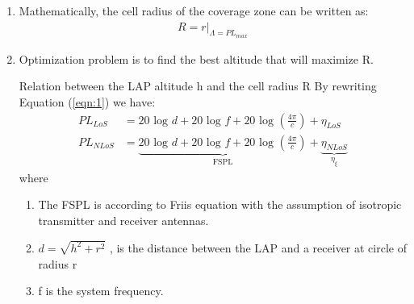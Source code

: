 \documentclass{beamer}
\begin{document}
\begin{frame}{}
    \begin{enumerate}
        \item Mathematically, the cell radius of the coverage zone can be written as:
        \begin{align}
            R = r|_{\Lambda = PL_{max}}
            \label{eqn:7}
        \end{align}
        \item Optimization problem is to find the best altitude that will maximize R.
        \begin{block}{Relation between the LAP altitude h and the cell radius R }
        By rewriting Equation (\ref{eqn:1}) we have: 
        \begin{align}
            PL_{LoS} &= 20 \text{ log } d + 20 \text{ log } f + 20\text{ log }(\frac{4 \pi}{c}) +   \eta_{LoS} 
            \label{eqn:8}\\
PL_{NLoS} &= \underbrace{20 \text{ log } d + 20 \text{ log } f + 20 \text{ log }(\frac{4 \pi}{c})}_\text{FSPL} +   \underbrace{\eta_{NLoS}}_\text{$\eta_\xi$}
\label{eqn:9}
        \end{align}where \begin{enumerate}
        \item The FSPL is according to Friis equation with
the assumption of isotropic transmitter and receiver antennas.
            \item $d = \sqrt{h^2 + r^2}$ , is the distance between the LAP and a receiver at circle of radius r
            \item f is the system frequency.
        \end{enumerate}
 
        \end{block}
    \end{enumerate}
\end{frame}
\end{document}
